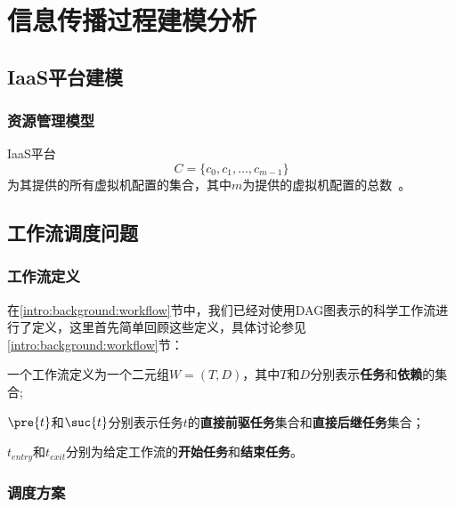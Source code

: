 \chapter{信息传播过程建模分析}

\section{IaaS平台建模}
\subsection{资源管理模型}

IaaS平台
\begin{equation}
C=\{c_0,c_1,\dotsc,c_{m-1}\}
\end{equation}
为其提供的所有虚拟机配置的集合，其中$m$为提供的虚拟机配置的总数~\cite{Cheng2014,Guille2013,Kupavskii2012,Lin2013,Matsubara2012,Saito2012,Silva2013,Taxidou2014}。




\section{工作流调度问题}

\subsection{工作流定义}

在\ref{intro:background:workflow}节中，我们已经对使用DAG图表示的科学工作流进行了定义，这里首先简单回顾这些定义，具体讨论参见\ref{intro:background:workflow}节：
\begin{asparaitem}
	\item 一个工作流定义为一个二元组$W=(T,D)$，其中$T$和$D$分别表示\textbf{任务}和\textbf{依赖}的集合;
	\item $\pre{t}$和$\suc{t}$分别表示任务$t$的\textbf{直接前驱任务}集合和\textbf{直接后继任务}集合；
	\item $t_{entry}$和$t_{exit}$分别为给定工作流的\textbf{开始任务}和\textbf{结束任务}。
\end{asparaitem}


\subsection{调度方案}
\label{prob:prob:schedule}

